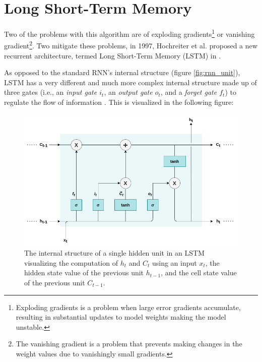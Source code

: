 
\newpage
\section{Long Short-Term Memory}\label{section:lstm}

Two of the problems with this algorithm are of exploding gradients\footnote{Exploding gradients is a problem when large error gradients accumulate, resulting in substantial updates to model weights making the model unstable.} or vanishing gradient\footnote{The vanishing gradient is a problem that prevents making changes in the weight values due to vanishingly small gradients.}. Two mitigate these problems, in 1997, Hochreiter et al. proposed a new recurrent architecture, termed Long Short-Term Memory (LSTM) in \cite{lstm}.

As opposed to the standard RNN's internal structure (figure \ref{fig:rnn_unit}), LSTM has a very different and much more complex internal structure made up of three gates (i.e., an \textit{input gate $i_t$}, an \textit{output gate $o_t$}, and a \textit{forget gate $f_t$}) to regulate the flow of information \cite{lstm_gates}. This is visualized in the following figure:

\begin{figure}[h]
	\centering
	\includegraphics[width=0.8\linewidth]{images/background/lstm_unit.png}
	\caption[Internal structure of a single hidden unit in an LSTM]%
	{The internal structure of a single hidden unit in an LSTM visualizing the computation of $h_t$ and $C_t$ using an input $x_t$, the hidden state value of the previous unit $h_{t-1}$, and the cell state value of the previous unit $C_{t-1}$.}
	\label{fig:lstm_unit}
\end{figure}

